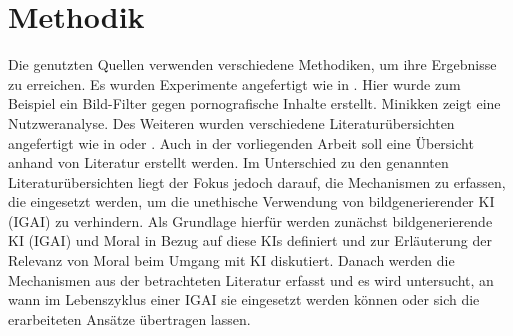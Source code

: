 \chapter{Methodik}

Die genutzten Quellen verwenden verschiedene Methodiken, um ihre Ergebnisse zu erreichen. Es wurden Experimente angefertigt wie in \cite{Zheng}. Hier wurde zum Beispiel ein Bild-Filter gegen pornografische Inhalte erstellt. Minikken \cite{Minkkinen} zeigt eine Nutzweranalyse. Des Weiteren wurden verschiedene Literaturübersichten angefertigt wie in \cite{Srinivasan} oder \cite{Jobin}.
Auch in der vorliegenden Arbeit soll eine Übersicht anhand von Literatur erstellt werden. Im Unterschied zu den genannten Literaturübersichten liegt der Fokus jedoch darauf, die Mechanismen zu erfassen, die eingesetzt werden, um die unethische Verwendung von bildgenerierender KI (IGAI) zu verhindern. Als Grundlage hierfür werden zunächst bildgenerierende KI (IGAI) und Moral in Bezug auf diese KIs definiert und zur Erläuterung der
Relevanz von Moral beim Umgang mit KI diskutiert. Danach werden die Mechanismen aus der betrachteten Literatur erfasst und es wird untersucht, an wann im Lebenszyklus einer IGAI sie eingesetzt werden können oder sich die erarbeiteten Ansätze übertragen lassen.